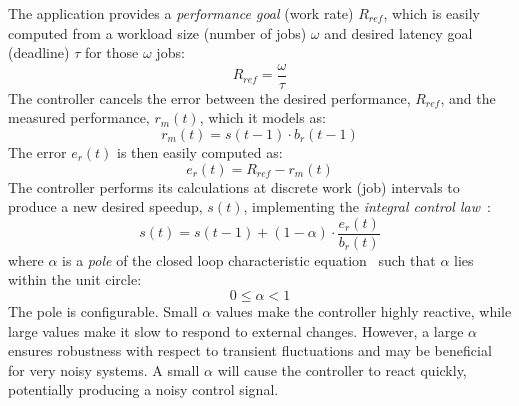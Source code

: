 The application provides a \emph{performance goal} (work rate) $R_{ref}$, which is easily computed from a workload size (number of jobs) $\omega$ and desired latency goal (deadline) $\tau$ for those $\omega$ jobs:
\begin{equation}
  R_{ref} = \frac{\omega}{\tau}
  \label{eqn:poet-latency-to-performance}
\end{equation}
The controller cancels the error between the desired performance, $R_{ref}$, and the measured performance, $r_m(t)$, which it models as:
\begin{equation}
r_m(t) = s(t-1) \cdot b_r(t-1)
\label{eqn:poet-performance}
\end{equation}
The error $e_r(t)$ is then easily computed as:
\begin{equation}
e_r(t) = R_{ref} - r_m(t)
\label{eqn:poet-error}
\end{equation}
The controller performs its calculations at discrete work (job) intervals to produce a new desired speedup, $s(t)$, implementing the \emph{integral control law}~\cite{Hellerstein2004a}:
\begin{equation}
  s(t) = s(t-1) + (1-\alpha) \cdot \frac{e_r(t)}{b_r(t)}
  \label{eqn:poet-control}
\end{equation}
where $\alpha$ is a \emph{pole} of the closed loop characteristic equation~\cite{ICSE2014} such that $\alpha$ lies within the unit circle:
\begin{equation}
  0 \le \alpha < 1
  \label{eqn:pole}
\end{equation}
The pole is configurable.
Small $\alpha$ values make the controller highly reactive, while large values make it slow to respond to external changes.
However, a large $\alpha$ ensures robustness with respect to transient fluctuations and may be beneficial for very noisy systems.
A small $\alpha$ will cause the controller to react quickly, potentially producing a noisy control signal.

